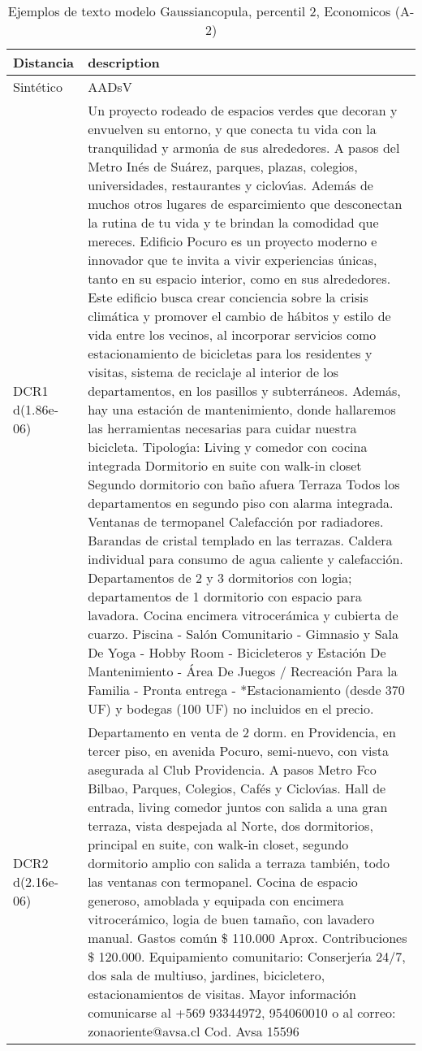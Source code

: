 \begin{table}[H]
\centering
\fontsize{10}{14}\selectfont
\caption{Ejemplos de texto modelo Gaussiancopula, percentil 2, Economicos (A-2)}
\label{table-example-economicos-a-2-gaussiancopula-2p-text}
\begin{tabular}{|l|m{35em}|}
\hline
\rowcolor[gray]{0.8}
Distancia & description \\
\hline Sintético & AADsV \\
\hline DCR1 d(1.86e-06) & Un proyecto rodeado de espacios verdes que decoran y envuelven su entorno, y que conecta tu vida con la tranquilidad y armon{\'\i}a de sus alrededores. A pasos del Metro In\'es de Su\'arez, parques, plazas, colegios, universidades, restaurantes y ciclov{\'\i}as. Adem\'as de muchos otros lugares de esparcimiento que desconectan la rutina de tu vida y te brindan la comodidad que mereces.  Edificio Pocuro es un proyecto moderno e innovador que te invita a vivir experiencias \'unicas, tanto en su espacio interior, como en sus alrededores. Este edificio busca crear conciencia sobre la crisis clim\'atica y promover el cambio de h\'abitos y estilo de vida entre los vecinos, al incorporar servicios como estacionamiento de bicicletas para los residentes y visitas, sistema de reciclaje al interior de los departamentos, en los pasillos y subterr\'aneos. Adem\'as, hay una estaci\'on de mantenimiento, donde hallaremos las herramientas necesarias para cuidar nuestra bicicleta.   Tipolog{\'\i}a: Living y comedor con cocina integrada  Dormitorio en suite con walk-in closet Segundo dormitorio con ba\~no afuera Terraza   Todos los departamentos en segundo piso con alarma integrada. Ventanas de termopanel Calefacci\'on por radiadores. Barandas de cristal templado en las terrazas. Caldera individual para consumo de agua caliente y calefacci\'on. Departamentos de 2 y 3 dormitorios con logia; departamentos de 1 dormitorio con espacio para lavadora. Cocina encimera vitrocer\'amica y cubierta de cuarzo.  Piscina - Sal\'on Comunitario - Gimnasio y Sala De Yoga - Hobby Room - Bicicleteros y Estaci\'on De Mantenimiento - \'Area De Juegos / Recreaci\'on Para la Familia   - Pronta entrega -  *Estacionamiento (desde 370 UF) y bodegas (100 UF) no incluidos en el precio. \\
\hline DCR2 d(2.16e-06) & Departamento en venta de 2 dorm. en Providencia, en tercer piso, en avenida Pocuro, semi-nuevo, con vista asegurada al Club Providencia. A pasos Metro Fco Bilbao, Parques, Colegios, Caf\'es y Ciclov{\'\i}as. Hall de entrada, living comedor juntos con salida a una gran terraza, vista despejada al Norte, dos dormitorios, principal en suite, con walk-in closet, segundo dormitorio amplio con salida a terraza tambi\'en, todo las ventanas con termopanel. Cocina de espacio generoso, amoblada y equipada con encimera vitrocer\'amico, logia de buen tama\~no, con lavadero manual. Gastos com\'un \$ 110.000 Aprox. Contribuciones \$ 120.000. Equipamiento comunitario: Conserjer{\'\i}a 24/7, dos sala de multiuso, jardines, bicicletero, estacionamientos de visitas. Mayor informaci\'on comunicarse al +569 93344972, 954060010 o al correo: zonaoriente@avsa.cl Cod. Avsa 15596 \\
\hline
\end{tabular}
\end{table}
